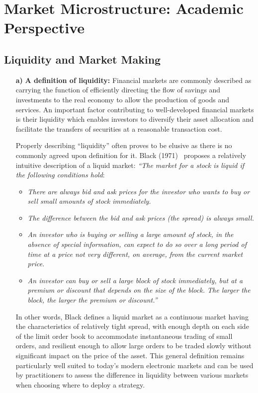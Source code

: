\section{Market Microstructure: Academic Perspective}
\subsection{Liquidity and Market Making}

\begin{enumerate}
\item[\textbf{a)}] \textbf{A definition of liquidity:} Financial markets are commonly described as carrying the function of efficiently directing the flow of savings and investments to the real economy to allow the production of goods and services. An important factor contributing to well-developed financial markets is their liquidity which enables investors to diversify their asset allocation and facilitate the transfers of securities at a reasonable transaction cost. 

Properly describing ``liquidity'' often proves to be elusive as there is no commonly agreed upon definition for it. Black (1971)~\cite{black71} proposes a relatively intuitive description of a liquid market:
\emph{``The market for a stock is liquid if the following conditions hold}:
	\begin{itemize}
	\item \emph{There are always bid and ask prices for the investor who wants to buy or sell small amounts of stock immediately.}
	\item \emph{The difference between the bid and ask prices (the spread) is always small.}
	\item \emph{An investor who is buying or selling a large amount of stock, in the absence of special information, can expect to do so over a long period of time at a price not very different, on average, from the current market price.}
	\item \emph{An investor can buy or sell a large block of stock immediately, but at a premium or discount that depends on the size of the block. The larger the block, the larger the premium or discount.''}
	\end{itemize}
In other words, Black defines a liquid market as a continuous market having the characteristics of relatively tight spread, with enough depth on each side of the limit order book to accommodate instantaneous trading of small orders, and resilient enough to allow large orders to be traded slowly without significant impact on the price of the asset. This general definition remains particularly well suited to today's modern electronic markets and can be used by practitioners to assess the difference in liquidity between various markets when choosing where to deploy a strategy. \twomedskip



\end{enumerate}
